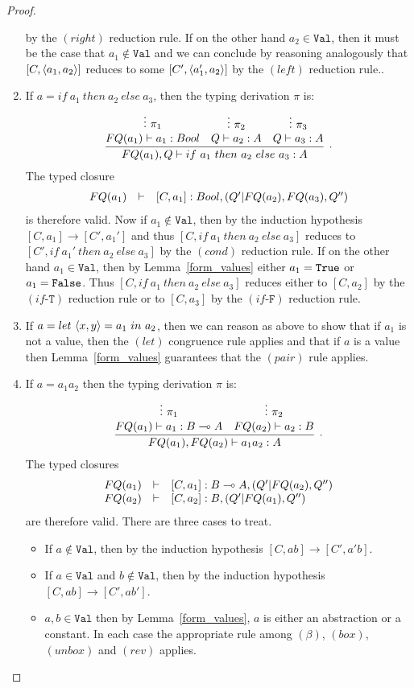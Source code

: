 \documentclass{article}
\begin{document}
\begin{proof}
\begin{enumerate}
  by the $(right)$ reduction rule.
  If on the other hand $a_2\in\mathtt{Val}$, then it must be the case that $a_1\notin\mathtt{Val}$ 
  and we can conclude by reasoning analogously that $[C,\langle a_1,a_2\rangle]$ reduces to 
  some $[C',\langle a_1',a_2\rangle]$ by the $(left)$ reduction rule.. 
  \item If $a=if ~a_1~ then ~a_2~ else ~a_3$, then the typing derivation $\pi$ is:
  \[
  \infer[.]{FQ(a_1),Q\entails if ~a_1~ then ~a_2~ else ~a_3:A}{
    \deduce[]{FQ(a_1)\entails a_1:Bool }{
      \vdots~\pi_1
    }
    &
    \deduce[]{Q \entails a_2:A}{
      \vdots~\pi_2
    }    
    &
    \deduce[]{Q \entails a_3:A}{
      \vdots~\pi_3
    }    
  }
  \]  
  The typed closure
  \[
  \begin{array}{rcl}
  FQ(a_1) & \vdash & [C,a_1]:Bool,(Q'|FQ(a_2),FQ(a_3),Q'')
  \end{array}
  \]
  is therefore valid. Now if $a_1\notin\mathtt{Val}$, then by the induction hypothesis 
  $[C,a_1]\to[C',a_1']$ and thus $[C,if ~a_1~ then ~a_2~ else ~a_3]$ reduces 
  to $[C',if ~a_1'~ then ~a_2~ else ~a_3]$ by the $(cond)$ reduction rule. 
  If on the other hand $a_1\in\mathtt{Val}$, then by 
  Lemma~\hyperref[form_values]{\ref*{form_values}} either $a_1=\texttt{True}$ or $a_1=\texttt{False}$. 
  Thus $[C,if ~a_1~ then ~a_2~ else ~a_3]$ reduces either to $[C,a_2]$ by the 
  $(if\mbox{-}\mathtt{T})$ reduction rule or 
  to $[C,a_3]$ by the $(if\mbox{-}\mathtt{F})$ reduction rule.
  \item If $a=let ~\langle x,y\rangle=a_1~ in ~a_2$, then we can reason as above to show that 
  if $a_1$ is not a value, then the $(let)$ congruence rule applies and that if 
  $a$ is a value then Lemma~\hyperref[form_values]{\ref*{form_values}} 
  guarantees that the $(pair)$ rule applies.
  \item If $a=a_1a_2$ then the typing derivation $\pi$ is: 
  \[
    \infer[.]{FQ(a_1),FQ(a_2)\entails a_1a_2:A}{
      \deduce[]{FQ(a_1)\entails a_1:B\loli A}{
        \vdots~\pi_1
      }
      &
      \deduce[]{FQ(a_2)\entails a_2:B}{
        \vdots~\pi_2
      }      
    }
  \]  
  The typed closures
  \[
  \begin{array}{rcl}
  FQ(a_1) & \vdash & [C,a_1]:B\multimap A,(Q'|FQ(a_2),Q'')\\
  FQ(a_2) & \vdash & [C,a_2]:B, (Q'|FQ(a_1),Q'')
  \end{array}
  \]
  are therefore valid. There are three cases to treat.
  \begin{itemize}
    \item If $a\notin\mathtt{Val}$, then by the induction hypothesis 
    $[C,ab]\to[C',a'b]$.
    \item If $a\in\mathtt{Val}$ and $b\notin\mathtt{Val}$, then by 
    the induction hypothesis $[C,ab]\to[C',ab']$.
    \item $a,b\in\mathtt{Val}$ then by 
    Lemma~\hyperref[form_values]{\ref*{form_values}}, $a$ is either 
    an abstraction or a constant. In each case the appropriate rule 
    among $(\beta)$, $(box)$, $(unbox)$ and $(rev)$ applies. 
  \end{itemize}
\end{enumerate}
\end{proof}


\end{document}
